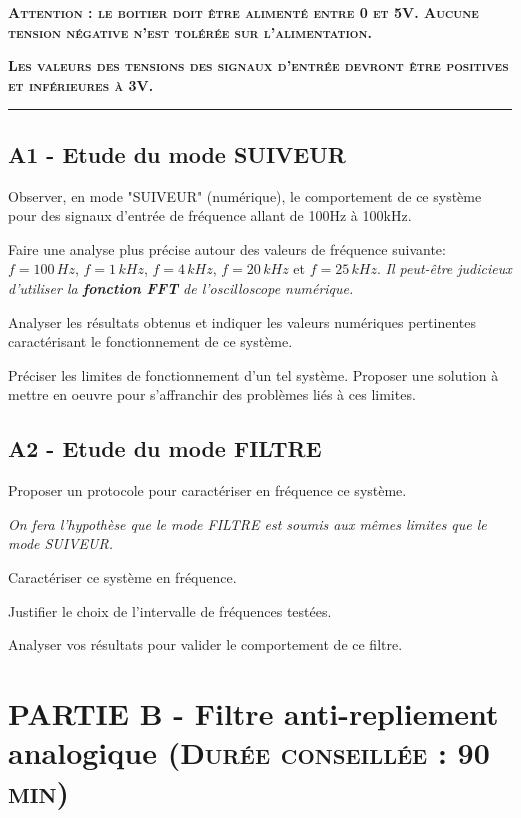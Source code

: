 \documentclass[a4paper,11pt]{article}
\begin{document}
\textbf{\large \textsc{Attention : le boitier doit être alimenté entre 0 et 5V. Aucune tension négative n'est tolérée sur l'alimentation.}}

\textbf{\large \textsc{Les valeurs des tensions des signaux d'entrée devront être positives et inférieures à 3V.}}

\noindent \rule{\linewidth}{1pt}


\subsection*{A1 - Etude du mode SUIVEUR}

\Real Observer, en mode "SUIVEUR" (numérique), le comportement de ce système pour des signaux d'entrée de fréquence allant de 100Hz à 100kHz.


\Real Faire une analyse plus précise autour des valeurs de fréquence suivante: $f = 100 \, Hz$, $f = 1 \, kHz$, $f = 4 \, kHz$, $f = 20 \, kHz$ et $f = 25 \, kHz$. \textit{Il peut-être judicieux d'utiliser la \textbf{fonction FFT} de l'oscilloscope numérique.}

\Real Analyser les résultats obtenus et indiquer les valeurs numériques pertinentes caractérisant le fonctionnement de ce système.

\Real Préciser les limites de fonctionnement d'un tel système. Proposer une solution à mettre en oeuvre pour s'affranchir des problèmes liés à ces limites.

\subsection*{A2 - Etude du mode FILTRE}

\Real Proposer un protocole pour caractériser en fréquence ce système.

\textit{On fera l'hypothèse que le mode FILTRE est soumis aux mêmes limites que le mode SUIVEUR.}

\Real Caractériser ce système en fréquence. 

\Real Justifier le choix de l'intervalle de fréquences testées.

\Real Analyser vos résultats pour valider le comportement de ce filtre.



\newpage

\section{PARTIE B - Filtre anti-repliement analogique \textsc{\normalsize(Durée conseillée : 90 min)}}
\end{document}
